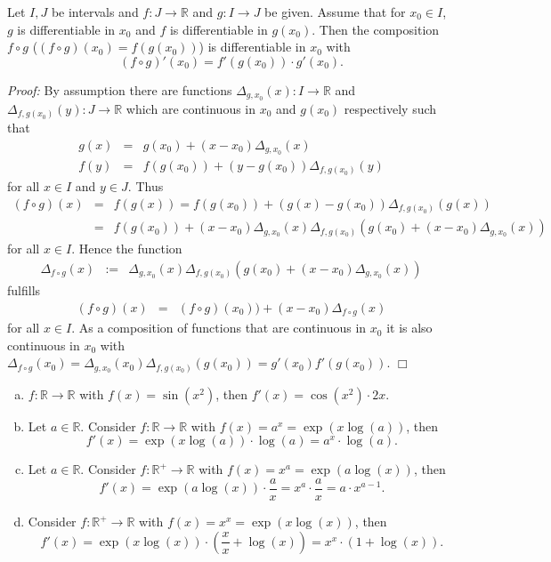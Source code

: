 

\begin{Theorem}
    Let $I,J$ be intervals and $f:J\to \mathbb{R}$ and $g:I\to J$ be given. Assume that for $x_0\in I$, $g$ is differentiable in $x_0$ and $f$ is differentiable in 
$g(x_0)$. Then the composition $f\circ g$ ($(f\circ g)(x_0)=f(g(x_0))$) is differentiable in $x_0$ with
\[(f\circ g)'(x_0)=f'(g(x_0))\cdot g'(x_0).\]
\end{Theorem}
{\em Proof:}
By assumption there are functions $\Delta_{g,x_0}(x):I\rightarrow \mathbb{R}$ and  $\Delta_{f,g(x_0)}(y):J\rightarrow \mathbb{R}$ 
which are continuous in $x_0$ and $g(x_0)$ respectively such that
\begin{eqnarray*}
 g(x) &=& g(x_0)+(x-x_0)\Delta_{g,x_0}(x) \\
 f(y) &=& f(g(x_0))+(y-g(x_0))\Delta_{f,g(x_0)}(y)
\end{eqnarray*}
for all $x\in I$ and $y\in J$. Thus
\begin{eqnarray*}
 (f\circ g)(x) &=& f(g(x)) = f(g(x_0))+(g(x)-g(x_0))\Delta_{f,g(x_0)}(g(x)) \\
               &=& f(g(x_0))+(x-x_0)\Delta_{g,x_0}(x)\Delta_{f,g(x_0)}(g(x_0)+(x-x_0)\Delta_{g,x_0}(x)) 
\end{eqnarray*}
for all $x\in I$. Hence the function 
\begin{eqnarray*}
 \Delta_{f\circ g}(x) &:=& \Delta_{g,x_0}(x)\Delta_{f,g(x_0)}(g(x_0)+(x-x_0)\Delta_{g,x_0}(x))
\end{eqnarray*}
fulfills
\begin{eqnarray*}
 (f\circ g)(x) &=& (f\circ g)(x_0))+(x-x_0)\Delta_{f\circ g}(x) 
\end{eqnarray*}
for all $x\in I$. As a composition of functions that are continuous in $x_0$ it is also continuous in $x_0$
with $\Delta_{f\circ g}(x_0)= \Delta_{g,x_0}(x_0)\Delta_{f,g(x_0)}(g(x_0)) =g'(x_0)f'(g(x_0))$.
$\Box$

\begin{example}
\begin{enumerate}[a)]
    \item $f:\mathbb{R}\to\mathbb{R}$ with $f(x)=\sin(x^2)$, then $f'(x)=\cos(x^2)\cdot 2x$.
    \item Let $a\in\mathbb{R}$. Consider $f:\mathbb{R}\to\mathbb{R}$ with $f(x)=a^x=\exp(x\log(a))$, then \[f'(x)=\exp(x\log(a))\cdot\log(a)=a^x\cdot\log(a).\]
    \item Let $a\in\mathbb{R}$. Consider $f:\mathbb{R}^+\to\mathbb{R}$ with $f(x)=x^a=\exp(a\log(x))$, then \[f'(x)=\exp(a\log(x))\cdot\frac{a}x=x^a\cdot \frac{a}x=a\cdot x^{a-1}.\]
    \item Consider $f:\mathbb{R}^+\to\mathbb{R}$ with $f(x)=x^x=\exp(x\log(x))$, then
\[f'(x)=\exp(x\log(x))\cdot\left(\frac{x}x+\log(x)\right)=x^x\cdot (1+\log(x)).\]
\end{enumerate}
\end{example}

